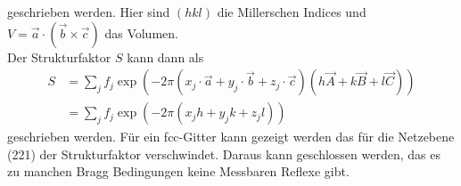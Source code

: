 geschrieben werden. Hier sind $(hkl)$ die Millerschen Indices und $V=\vec{a}\cdot(\vec{b}\times\vec{c})$ das Volumen.\\
Der Strukturfaktor $S$ kann dann als
\begin{align}
	S &= \sum_j f_j\exp(-2\pi\left(x_j\cdot\vec{a}+y_j\cdot\vec{b}+z_j\cdot\vec{c}\right)\left(h\vec{A}+k\vec{B}+l\vec{C}\right) )\\
	&=\sum_jf_j\exp(-2\pi\left(x_jh+y_jk+z_jl\right))
\end{align}
geschrieben werden. Für ein fcc-Gitter kann gezeigt werden das für die Netzebene (221) der Strukturfaktor verschwindet. Daraus kann geschlossen werden, das es zu manchen Bragg Bedingungen keine Messbaren Reflexe gibt.
